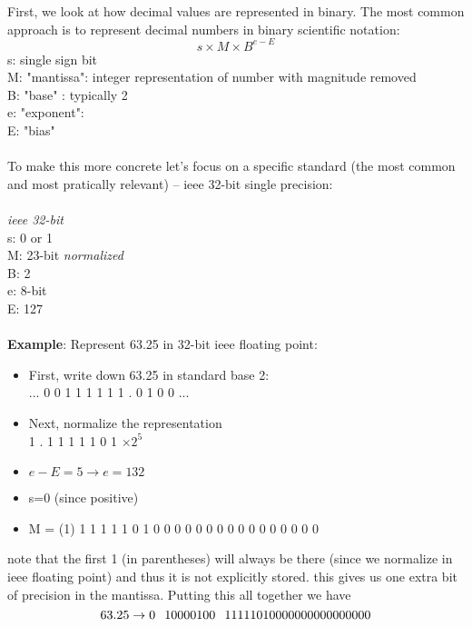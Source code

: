 \documentclass[11pt]{article}
\begin{document}
First, we look at how decimal values are represented in binary. The most common approach is to
represent decimal numbers in binary scientific notation:
$$ s \times M \times B^{e-E} $$ 
s: single sign bit  \\
M: "mantissa": integer representation of number with magnitude removed  \\
B: "base" : typically 2 \\
e: "exponent":  \\
E: "bias" \\
\\
To make this more concrete let's focus on a specific standard (the
most common and most pratically relevant) -- ieee 32-bit single
precision: \\
\\
{ \em ieee 32-bit} \\
s: 0 or 1  \\
M: 23-bit {\em normalized}\\
B: 2 \\
e: 8-bit \\
E: 127 \\
\\
{\bf Example}: Represent 63.25 in 32-bit ieee floating point:
\begin{itemize}
\item First, write down 63.25 in standard base 2: \\
... 0 0 1 1 1 1 1  1 . 0 1 0 0 ... 
\item Next, normalize the representation \\
  1 . 1 1 1 1  1 0 1  $\times 2^5$ 
\item $e-E = 5 \rightarrow e = 132$
\item s=0 (since positive)
\item M = (1) 1 1 1 1 1 0 1 0 0 0 0 0 0 0 0 0 0 0 0 0 0 0 0 \\
\end{itemize}
note that the first 1 (in parentheses) will always be there (since we normalize in ieee floating point)
and thus it is not explicitly stored. this gives us one extra bit of precision in the mantissa.
Putting this all together we have \\
$$ 63.25 \rightarrow 0\hspace{.1in} 10000100\hspace{.1in} 11111010000000000000000 $$ 
\end{document}
